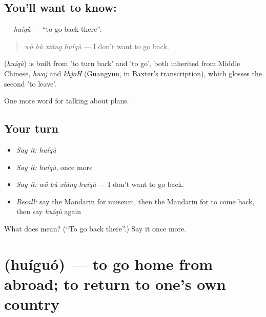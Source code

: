\subsection*{You'll want to know: }
\textbf{} — \emph{huíqù} — \textquotedblleft{}to go back there\textquotedblright{}.

\begin{quote}
\textbf{} \emph{wǒ bù xiǎng huíqù} — I don't want to go back.
\end{quote}

\begin{cousinweb}
\textbf{} (\emph{huíqù}) is built from  'to turn back' and  'to go', both inherited from Middle Chinese, \emph{hwoj} and \emph{khjoH} (Guangyun, in Baxter's transcription), which glosses the second 'to leave'.
\end{cousinweb}

\begin{grammarlens}[title={What you've built}]
One more word for talking about plans.
\end{grammarlens}

\subsection*{Your turn}
\begin{itemize}
\raggedright
  \item \emph{Say it:} \emph{huíqù}
  \item \emph{Say it:} \emph{huíqù}, once more
  \item \emph{Say it:} \emph{wǒ bù xiǎng huíqù} — I don't want to go back.
  \item \emph{Recall:} say the Mandarin for museum, then the Mandarin for to come back, then say \emph{huíqù} again
\end{itemize}

\begin{tcolorbox}[breakable,colback=teal!4,colframe=teal!35!black,title={Before you move on}]
What does  mean? (\textquotedblleft{}To go back there\textquotedblright{}.) Say it once more.
\end{tcolorbox}
\section[\texorpdfstring{\zh{回国} (huíguó)}{回国 (huíguó)}]{ (huíguó) — to go home from abroad; to return to one's own country}

\label{lesson:ZH-C191-huiguo}



